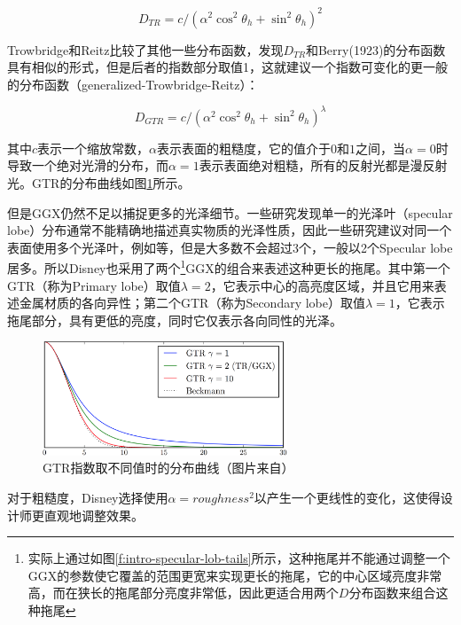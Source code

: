 \begin{equation}
	D_{TR}=c/(\alpha^2 \cos^2\theta_h +\sin^2\theta_h)^2
\end{equation}

\noindent Trowbridge和Reitz比较了其他一些分布函数，发现$D_{TR}$和Berry(1923)的分布函数具有相似的形式，但是后者的指数部分取值1，这就建议一个指数可变化的更一般的分布函数（generalized-Trowbridge-Reitz）：

\begin{equation}
	D_{GTR}=c/(\alpha^2 \cos^2\theta_h +\sin^2\theta_h)^\lambda
\end{equation}

\noindent 其中$c$表示一个缩放常数，$\alpha$表示表面的粗糙度，它的值介于$0$和$1$之间，当$\alpha=0$时导致一个绝对光滑的分布，而$\alpha=1$表示表面绝对粗糙，所有的反射光都是漫反射光。GTR的分布曲线如图\ref{f:intro-gtr}所示。

但是GGX仍然不足以捕捉更多的光泽细节。一些研究发现单一的光泽叶（specular lobe）分布通常不能精确地描述真实物质的光泽性质，因此一些研究建议对同一个表面使用多个光泽叶，例如\cite{a:GlobalOptimizationforEstimatingaMultiple-LobeAnalyticalBRDF}等，但是大多数不会超过3个，一般以2个Specular lobe居多。所以Disney也采用了两个\footnote{实际上通过如图\ref{f:intro-specular-lob-tails}所示，这种拖尾并不能通过调整一个GGX的参数使它覆盖的范围更宽来实现更长的拖尾，它的中心区域亮度非常高，而在狭长的拖尾部分亮度非常低，因此更适合用两个$D$分布函数来组合这种拖尾}GGX的组合来表述这种更长的拖尾。其中第一个GTR（称为Primary lobe）取值$\lambda=2$，它表示中心的高亮度区域，并且它用来表述金属材质的各向异性；第二个GTR（称为Secondary lobe）取值$\lambda=1$，它表示拖尾部分，具有更低的亮度，同时它仅表示各向同性的光泽。

\begin{figure}
	\sidecaption
	\includegraphics[width=0.65\textwidth]{figures/intro/gtr}
	\caption{GTR指数取不同值时的分布曲线（图片来自\cite{a:PhysicallyBasedShadingatDisney}）}
	\label{f:intro-gtr}
\end{figure}

对于粗糙度，Disney选择使用$\alpha=roughness^2$以产生一个更线性的变化，这使得设计师更直观地调整效果。

